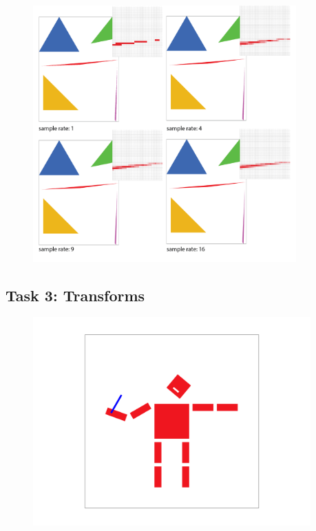 \documentclass[11pt]{article}
\begin{document}
\begin{figure}[h]
    \centering
    \includegraphics[width=0.90\textwidth]{T2f6.png} %
  \end{figure}
\newpage
\subsection*{Task 3: Transforms}
\begin{figure}[h]
    \centering
    \includegraphics[width=0.95\textwidth]{T3.png} %
  \end{figure}
\end{document}
